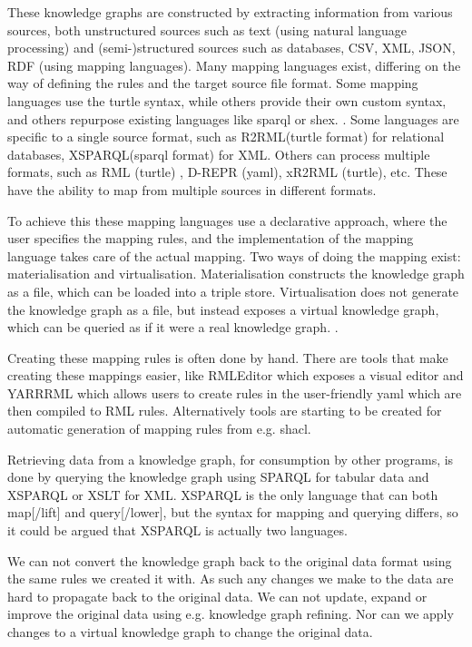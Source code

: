 These knowledge graphs are constructed by extracting information from various sources, both unstructured sources such as text (using natural language processing) and (semi-)structured sources such as databases, CSV, XML, JSON, RDF (using mapping languages). Many mapping languages exist, differing on the way of defining the rules and the target source file format. Some mapping languages use the turtle syntax, while others provide their own custom syntax, and others repurpose existing languages like \acrshort{sparql} or \acrshort{shex}. \citep{VANASSCHE2023100753}. Some languages are specific to a single source format, such as R2RML(turtle format) \citep{Das:12:RRR} for relational databases, XSPARQL(\acrshort{sparql} format) \citep{Bischof2012} for XML. Others can process multiple formats, such as RML (turtle) \citep{dimou_ldow_2014}, D-REPR (\acrshort{yaml}), xR2RML (turtle), etc. These have the ability to map from multiple sources in different formats.

To achieve this these mapping languages use a declarative approach, where the user specifies the mapping rules, and the implementation of the mapping language takes care of the actual mapping. Two ways of doing the mapping exist: materialisation and virtualisation. Materialisation constructs the knowledge graph as a file, which can be loaded into a triple store. Virtualisation does not generate the knowledge graph as a file, but instead exposes a virtual knowledge graph, which can be queried as if it were a real knowledge graph. \citep{ontop}.

Creating these mapping rules is often done by hand. There are tools that make creating these mappings easier, like RMLEditor \citep{heyvaert_jws_2018} which exposes a visual editor and YARRRML \citep{10.1007/978-3-319-98192-5_40} which allows users to create rules in the user-friendly \acrshort{yaml} which are then compiled to RML rules. Alternatively tools are starting to be created for automatic generation of mapping rules from e.g. \acrshort{shacl}.

Retrieving data from a knowledge graph, for consumption by other programs, is done by querying the knowledge graph using SPARQL \citep{Seaborne:08:SQL} for tabular data and XSPARQL \citep{Bischof2012} or XSLT for XML. XSPARQL is the only language that can both map[/lift] and query[/lower], but the syntax for mapping and querying differs, so it could be argued that XSPARQL is actually two languages.

We can not convert the knowledge graph back to the original data format using the same rules we created it with. As such any changes we make to the data are hard to propagate back to the original data. We can not update, expand or improve the original data using e.g. knowledge graph refining. Nor can we apply changes to a virtual knowledge graph to change the original data. 


